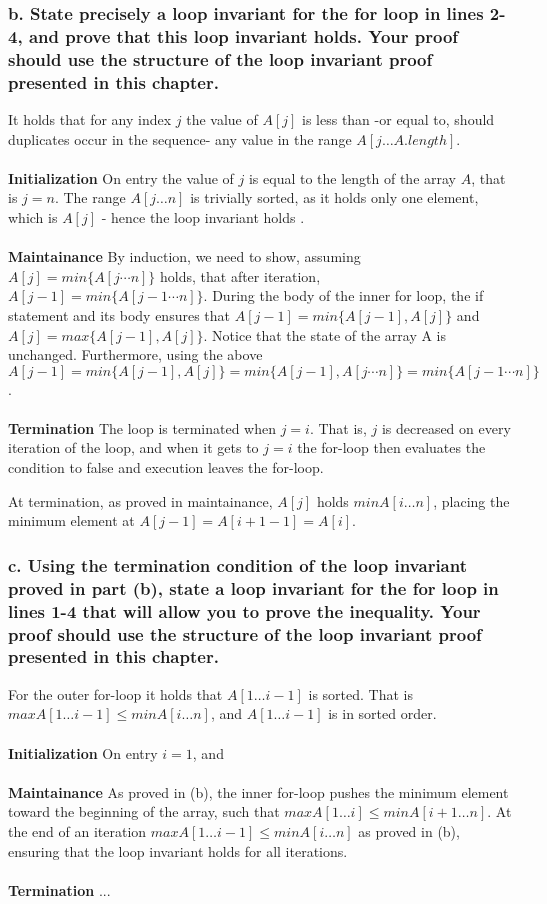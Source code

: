 \documentclass[11pt,english]{article}
\begin{document}
\subsubsection*{b. \mdseries State precisely a loop invariant for the
\textbf{for} loop in lines 2-4, and prove that this loop invariant holds. Your
proof should use the structure of the loop invariant proof presented in this
chapter.}
It holds that for any index $j$ the value of $A[j]$ is less than -or equal to,
should duplicates occur in the sequence- any value in the range
$A[j \dots A.length]$.
\\\\
\textbf{Initialization} \mdseries On entry the value of $j$ is equal to the
length of the array $A$, that is $j = n$. The range $A[j \dots n]$ is
trivially sorted, as it holds only one element, which is $A[j]$ - hence the
loop invariant holds .
\\\\
\textbf{Maintainance} \mdseries By induction, we need to show, assuming
$A[j] = min\{A[j \cdots n]\}$ holds, that after iteration, $A[j-1] = min\{
A[j-1 \cdots n]\}$. During the body of the inner for loop, the if
statement and its body ensures that $A[j-1] = min\{A[j-1],A[j]\}$ and $A[j] 
= max\{A[j-1],A[j]\}$. Notice that the state of the array A is unchanged.
Furthermore, using the above $A[j-1] = min\{A[j-1],A[j]\} = min\{A[j-1],
A[j \cdots n]\} = min\{A[j-1 \cdots n]\}$.
\\\\
\textbf{Termination} \mdseries The loop is terminated when $j = i$. That is,
$j$ is decreased on every iteration of the loop, and when it gets to
$j = i$ the for-loop then evaluates the condition to false and execution
leaves the for-loop.

At termination, as proved in maintainance, $A[j]$ holds $min{A[i \dots n]}$,
placing the minimum element at $A[j - 1] = A[i + 1 - 1] = A[i]$.

\subsubsection*{c. \mdseries Using the termination condition of the loop
invariant proved in part (b), state a loop invariant for the \textbf{for} loop
in lines 1-4 that will allow you to prove the inequality. Your proof should
use the structure of the loop invariant proof presented in this chapter.}
For the outer for-loop it holds that $A[1 \dots i-1]$ is sorted. That is
$max{A[1 \dots i - 1]} \leq min{A[i \dots n]}$, and $A[1 \dots i-1]$ is
in sorted order.
\\\\
\textbf{Initialization} \mdseries On entry $i = 1$, and 
\\\\
\textbf{Maintainance} \mdseries As proved in (b), the inner for-loop pushes
the minimum element toward the beginning of the array, such that
$max{A[1 \dots i]} \leq min{A[i + 1 \dots n]}$. At the end of an iteration
$max{A[1 \dots i - 1]} \leq min{A[i \dots n]}$ as proved in (b), ensuring that
the loop invariant holds for all iterations.
\\\\
\textbf{Termination} \mdseries ...
\end{document}
